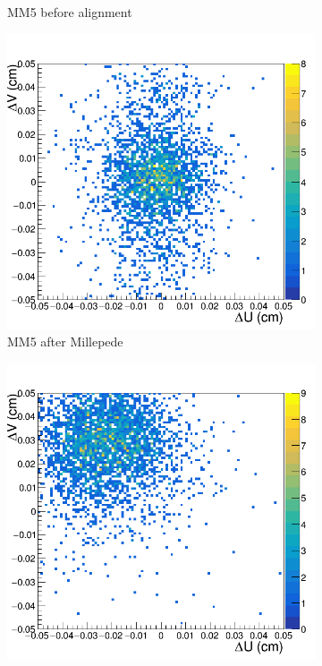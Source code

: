 \begin{figure}[h!]
\begin{subfigure}[l]{.45\textwidth}
   \caption{MM5 before alignment}
   \label{fig:MX5_before}
 \end{subfigure}
 \begin{subfigure}[r]{.45\textwidth}
   \centering
   \includegraphics[width=\linewidth]{thesis_figures/alignment/Run_3211_after_millepede/square/MX5.png}
   \caption{MM5 after Millepede}
   \label{fig:MX5_after}
 \end{subfigure}
 \begin{subfigure}[l]{.45\textwidth}
   \centering
   \includegraphics[width=\linewidth]{thesis_figures/alignment/Run_3211_before/square/MX7.png}


\end{subfigure}
\end{figure}
